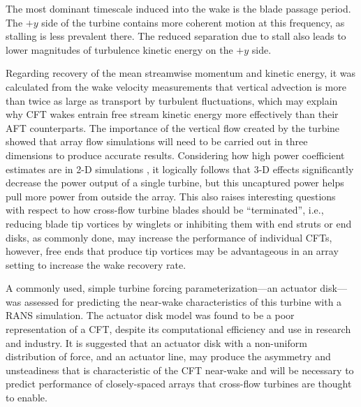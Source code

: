 The most dominant timescale induced into the wake is the blade passage period. 
The $+y$ side of the turbine contains more coherent motion at this
frequency, as stalling is less prevalent there. The reduced separation due to 
stall also leads to lower magnitudes of turbulence kinetic energy on the $+y$ 
side. 

Regarding recovery of the mean streamwise momentum and kinetic energy, it was
calculated from the wake velocity measurements that vertical advection is more
than twice as large as transport by turbulent fluctuations, which may explain
why CFT wakes entrain free stream kinetic energy more effectively than their AFT
counterparts. The importance of the vertical flow created by the turbine showed
that array flow simulations will need to be carried out in three dimensions to
produce accurate results. Considering how high power coefficient estimates are
in 2-D simulations \cite{Li2013}, it logically follows that 3-D effects
significantly decrease the power output of a single turbine, but this uncaptured
power helps pull more power from outside the array. This also raises interesting
questions with respect to how cross-flow turbine blades should be
``terminated'', i.e., reducing blade tip vortices by winglets or inhibiting them
with end struts or end disks, as commonly done, may increase the performance of
individual CFTs, however, free ends that produce tip vortices may be
advantageous in an array setting to increase the wake recovery rate.

A commonly used, simple turbine forcing parameterization---an actuator
disk---was assessed for predicting the near-wake characteristics of this turbine
with a RANS simulation. The actuator disk model was found to be a poor
representation of a CFT, despite its computational efficiency and use in
research and industry. It is suggested that an actuator disk with a non-uniform
distribution of force, and an actuator line, may produce the asymmetry and
unsteadiness that is characteristic of the CFT near-wake and will be necessary
to predict performance of closely-spaced arrays that cross-flow turbines are
thought to enable.